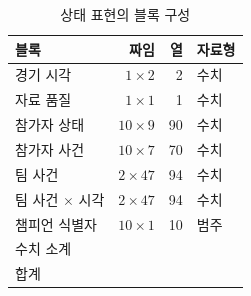 \begin{table}[!t]
  \centering
  \caption{상태 표현의 블록 구성}
  \label{tab:input-blocks}
  \small
  \begin{tabular}{@{}lrrl@{}}
    \toprule
    블록 & 짜임 & 열 & 자료형 \\
    \midrule
    경기 시각 & $1 \times 2$ & 2 & 수치 \\
    자료 품질 & $1 \times 1$ & 1 & 수치 \\
    참가자 상태 & $10 \times 9$ & 90 & 수치 \\
    참가자 사건 & $10 \times 7$ & 70 & 수치 \\
    팀 사건 & $2 \times 47$ & 94 & 수치 \\
    팀 사건 $\times$ 시각 & $2 \times 47$ & 94 & 수치 \\
    챔피언 식별자 & $10 \times 1$ & 10 & 범주 \\
    \midrule
    수치 소계 & & \dimNumeric{} & \\
    합계 & & \dimExpanded{} & \\
    \bottomrule
  \end{tabular}
\end{table}

